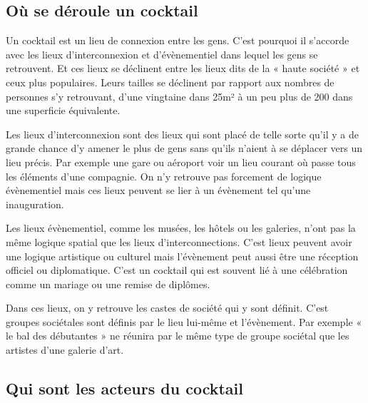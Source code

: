 \subsection{Où se déroule un cocktail}


Un cocktail est un lieu de connexion entre les gens. C’est pourquoi il s’accorde avec les lieux d’interconnexion et d’évènementiel dans lequel les gens se retrouvent. Et ces lieux se déclinent entre les lieux dits de la « haute société » et ceux plus populaires. Leurs tailles se déclinent par rapport aux nombres de personnes s’y retrouvant, d’une vingtaine dans 25m² à un peu plus de 200 dans une superficie équivalente.

Les lieux d’interconnexion sont des lieux qui sont placé de telle sorte qu’il y a de grande chance d’y amener le plus de gens sans qu’ils n’aient à se déplacer vers un lieu précis. Par exemple une gare ou aéroport voir un lieu courant où passe tous les éléments d’une compagnie. On n’y retrouve pas forcement de logique évènementiel mais ces lieux peuvent se lier à un évènement tel qu’une inauguration.

Les lieux évènementiel, comme les musées, les hôtels ou les galeries, n’ont pas la même logique spatial que les lieux d’interconnections.  C’est lieux peuvent avoir une logique artistique ou culturel mais l’évènement peut aussi être une réception officiel ou diplomatique. C’est un cocktail qui est souvent lié à une célébration comme un mariage ou une remise de diplômes.

Dans ces lieux, on y retrouve les castes de société qui y sont définit. C’est groupes sociétales sont définis par le lieu lui-même et l’évènement. Par exemple « le bal des débutantes » ne réunira par le même type de groupe sociétal que les artistes d’une galerie d’art.


\subsection{Qui sont les acteurs du cocktail}


